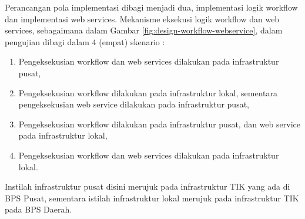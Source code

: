 Perancangan pola implementasi dibagi menjadi dua, implementasi logik workflow dan implementasi web services. Mekanisme eksekusi logik workflow dan web services, sebagaimana dalam Gambar \ref{fig:design-workflow-webservice}, dalam pengujian dibagi dalam 4 (empat) skenario :
\begin{enumerate}
\item Pengeksekusian workflow dan web services dilakukan pada infrastruktur pusat,
\item Pengeksekusian workflow dilakukan pada infrastruktur lokal, sementara pengeksekusian web service dilakukan pada infrastruktur pusat,
\item Pengeksekusian workflow dilakukan pada infrastruktur pusat, dan web service pada infrastruktur lokal,
\item Pengeksekusian workflow dan web services dilakukan pada infrastruktur lokal.
\end{enumerate}
Instilah infrastruktur pusat disini merujuk pada infrastruktur TIK yang ada di BPS Pusat, sementara istilah infrastruktur lokal merujuk pada infrastruktur TIK pada BPS Daerah.


